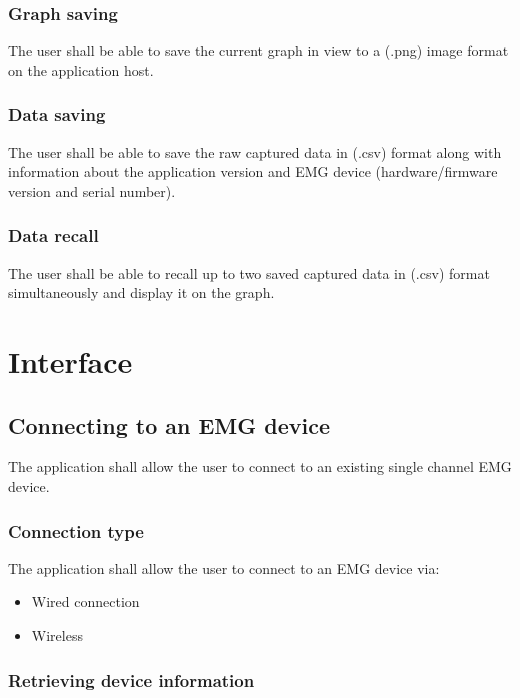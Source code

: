 \documentclass[12pt,a4paper]{article}
\begin{document}
\subsubsection{Graph saving}

The user shall be able to save the current graph in view to a (.png) image format on the application host.

\subsubsection{Data saving}

The user shall be able to save the raw captured data in (.csv) format along with information about the application version and EMG device (hardware/firmware version and serial number).

\subsubsection{Data recall}

The user shall be able to recall up to two saved captured data in (.csv) format simultaneously and display it on the graph.

\section{Interface}

\subsection{Connecting to an EMG device}

The application shall allow the user to connect to an existing single channel EMG device.

\subsubsection{Connection type}

The application shall allow the user to connect to an EMG device via:

\begin{itemize}
\item Wired connection
\item Wireless
\end{itemize}

\subsubsection{Retrieving device information}
\end{document}
